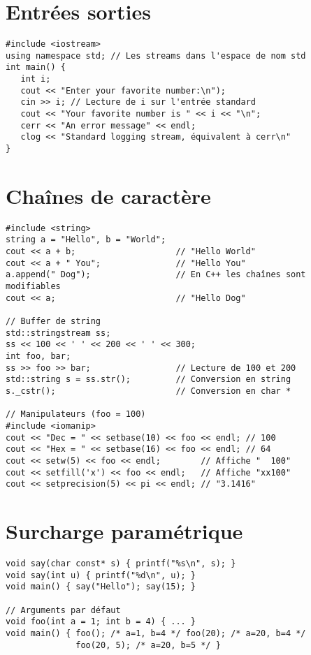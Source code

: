 \documentclass{article}
\begin{document}
\begin{multicols*}{3}
\section*{Entrées sorties}

\begin{lstlisting}
#include <iostream>
using namespace std; // Les streams dans l'espace de nom std
int main() {
   int i;
   cout << "Enter your favorite number:\n");
   cin >> i; // Lecture de i sur l'entrée standard
   cout << "Your favorite number is " << i << "\n";
   cerr << "An error message" << endl;
   clog << "Standard logging stream, équivalent à cerr\n"
}
\end{lstlisting}

\section*{Chaînes de caractère}

\begin{lstlisting}
#include <string>
string a = "Hello", b = "World";
cout << a + b;                    // "Hello World"
cout << a + " You";               // "Hello You"
a.append(" Dog");                 // En C++ les chaînes sont modifiables
cout << a;                        // "Hello Dog"

// Buffer de string
std::stringstream ss;
ss << 100 << ' ' << 200 << ' ' << 300;
int foo, bar;
ss >> foo >> bar;                 // Lecture de 100 et 200
std::string s = ss.str();         // Conversion en string
s._cstr();                        // Conversion en char *

// Manipulateurs (foo = 100)
#include <iomanip>
cout << "Dec = " << setbase(10) << foo << endl; // 100
cout << "Hex = " << setbase(16) << foo << endl; // 64
cout << setw(5) << foo << endl;        // Affiche "  100"
cout << setfill('x') << foo << endl;   // Affiche "xx100"
cout << setprecision(5) << pi << endl; // "3.1416"
\end{lstlisting}

\section*{Surcharge paramétrique}

\begin{lstlisting}
void say(char const* s) { printf("%s\n", s); }
void say(int u) { printf("%d\n", u); }
void main() { say("Hello"); say(15); }

// Arguments par défaut
void foo(int a = 1; int b = 4) { ... }
void main() { foo(); /* a=1, b=4 */ foo(20); /* a=20, b=4 */
              foo(20, 5); /* a=20, b=5 */ }
\end{lstlisting}


\end{multicols*}
\end{document}
